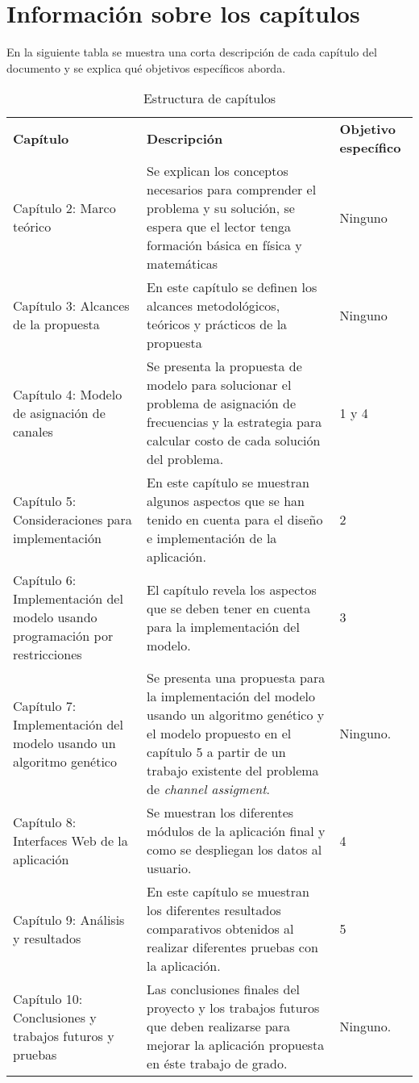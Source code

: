 \section{Información sobre los capítulos}

En la siguiente tabla se muestra una corta descripción de cada capítulo del documento y se explica qué objetivos específicos aborda.  


\begin{longtable}{|p{4.5cm}|p{8.5cm}|p{2.5cm}|}
\caption{Estructura de capítulos} \\
\cline{1-3} 
\cellcolor[gray]{0.9} \textbf{Capítulo} & \cellcolor[gray]{0.9}\textbf{Descripción} &  \cellcolor[gray]{0.9}\textbf{Objetivo específico}\\
\cline{1-3}
Capítulo 2: {Marco teórico} & {Se explican los conceptos necesarios para comprender el problema y su solución, se espera que el lector tenga formación básica en física y matemáticas} & {Ninguno}\\
\cline{1-3}
Capítulo 3: {Alcances de la propuesta} & {En este capítulo se definen los alcances metodológicos, teóricos y prácticos de la propuesta} & {Ninguno}\\
\cline{1-3}
Capítulo 4: {Modelo de asignación de canales} & {Se presenta la propuesta de modelo para solucionar el problema de asignación de frecuencias y la estrategia para calcular costo de cada solución del problema.} & 1 y 4\\
\cline{1-3}
Capítulo 5: {Consideraciones para implementación} & {En este capítulo se muestran algunos aspectos que se han tenido en cuenta para el diseño e implementación de la aplicación.} &  2\\
\cline{1-3}
Capítulo 6: {Implementación del modelo usando programación por restricciones} & {El capítulo revela los aspectos que se deben tener en cuenta para la implementación del modelo.} &  3\\
\cline{1-3}
Capítulo 7: {Implementación del modelo usando un algoritmo genético} & {Se presenta una propuesta para la implementación del modelo usando un algoritmo genético y el modelo propuesto en el capítulo 5 a partir de un trabajo existente del problema de \textit{channel assigment}.}  & {Ninguno.}\\
\cline{1-3}
Capítulo 8: {Interfaces Web de la aplicación} & {Se muestran los diferentes módulos de la aplicación final y como se despliegan los datos al usuario.} &  4\\
\cline{1-3}
Capítulo 9: {Análisis y resultados} & {En este capítulo se muestran los diferentes resultados comparativos obtenidos al realizar diferentes pruebas con la aplicación.} &  5\\
\cline{1-3}
Capítulo 10: {Conclusiones y trabajos futuros y pruebas} & {Las conclusiones finales del proyecto y los trabajos futuros que deben realizarse para mejorar la aplicación propuesta en éste trabajo de grado.} & Ninguno.\\
\cline{1-3}
\end{longtable}

